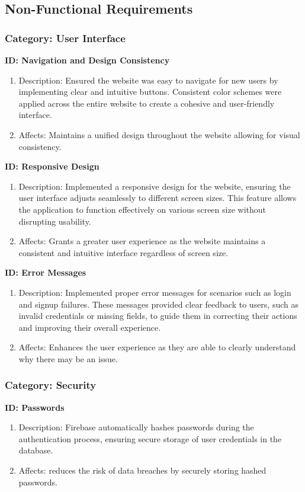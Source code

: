 \subsection{Non-Functional Requirements}

\subsubsection{Category: User Interface}
\textbf{ID: Navigation and Design Consistency}
\begin{enumerate}
    \item Description: Ensured the website was easy to navigate for new users by implementing clear and intuitive buttons. Consistent color schemes were applied across the entire website to create a cohesive and user-friendly interface.
    \item Affects: Maintains a unified design throughout the website allowing for visual consistency.
\end{enumerate}
\vspace{1em}
\textbf{ID: Responsive Design}
\begin{enumerate}
    \item Description: Implemented a responsive design for the website, ensuring the user interface adjusts seamlessly to different screen sizes. This feature allows the application to function effectively on various screen size without disrupting usability.
    \item Affects: Grants a greater user experience as the website maintains a consistent and intuitive interface regardless of screen size.
\end{enumerate}
\vspace{1em}
\textbf{ID: Error Messages}
\begin{enumerate}
    \item Description: Implemented proper error messages for scenarios such as login and signup failures. These messages provided clear feedback to users, such as invalid credentials or missing fields, to guide them in correcting their actions and improving their overall experience.
    \item Affects: Enhances the user experience as they are able to clearly understand why there may be an issue.
\end{enumerate}
\subsubsection{Category: Security}
\textbf{ID: Passwords}
\begin{enumerate}
    \item Description: Firebase automatically hashes passwords during the authentication process, ensuring secure storage of user credentials in the database.
    \item Affects: reduces the risk of data breaches by securely storing hashed passwords.
\end{enumerate}
\vspace{1em}

